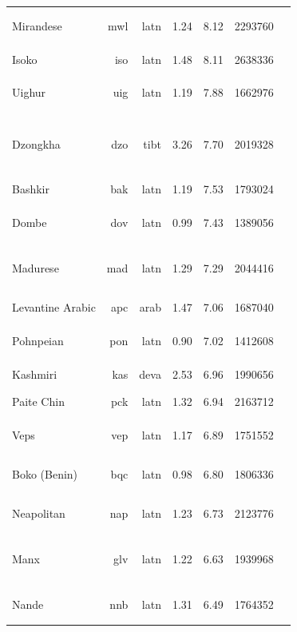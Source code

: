 \documentclass[11pt]{article}
\begin{document}
\begin{center}
\begin{longtable}[width=0.9\textwidth]{|lrrrrrl|}
Mirandese & mwl & latn & 1.24 & 8.12 & 2293760 & {\color{glot500}\rule{2.55cm}{8pt}}{\color{other}\rule{1.4500000000000002cm}{8pt}} \\ 
Isoko & iso & latn & 1.48 & 8.11 & 2638336 & {\color{madlad400}\rule{4.0cm}{8pt}} \\ 
Uighur & uig & latn & 1.19 & 7.88 & 1662976 & {\color{glot500}\rule{0.09cm}{8pt}}{\color{other}\rule{3.91cm}{8pt}} \\ 
Dzongkha & dzo & tibt & 3.26 & 7.70 & 2019328 & {\color{nllb}\rule{0.09cm}{8pt}}{\color{madlad400}\rule{2.99cm}{8pt}}{\color{glot500}\rule{0.54cm}{8pt}}{\color{other}\rule{0.3799999999999999cm}{8pt}} \\ 
Bashkir & bak & latn & 1.19 & 7.53 & 1793024 & {\color{glot500}\rule{4.0cm}{8pt}} \\ 
Dombe & dov & latn & 0.99 & 7.43 & 1389056 & {\color{madlad400}\rule{3.57cm}{8pt}}{\color{other}\rule{0.43000000000000016cm}{8pt}} \\ 
Madurese & mad & latn & 1.29 & 7.29 & 2044416 & {\color{madlad400}\rule{1.03cm}{8pt}}{\color{glot500}\rule{0.34cm}{8pt}}{\color{other}\rule{2.63cm}{8pt}} \\ 
Levantine Arabic & apc & arab & 1.47 & 7.06 & 1687040 & {\color{glot500}\rule{4.0cm}{8pt}}{\color{other}\rule{0.0cm}{8pt}} \\ 
Pohnpeian & pon & latn & 0.90 & 7.02 & 1412608 & {\color{glot500}\rule{0.78cm}{8pt}}{\color{other}\rule{3.2199999999999998cm}{8pt}} \\ 
Kashmiri & kas & deva & 2.53 & 6.96 & 1990656 & {\color{nllb}\rule{4.0cm}{8pt}} \\ 
Paite Chin & pck & latn & 1.32 & 6.94 & 2163712 & {\color{madlad400}\rule{4.0cm}{8pt}} \\ 
Veps & vep & latn & 1.17 & 6.89 & 1751552 & {\color{glot500}\rule{1.82cm}{8pt}}{\color{other}\rule{2.1799999999999997cm}{8pt}} \\ 
Boko (Benin) & bqc & latn & 0.98 & 6.80 & 1806336 & {\color{glot500}\rule{1.93cm}{8pt}}{\color{other}\rule{2.0700000000000003cm}{8pt}} \\ 
Neapolitan & nap & latn & 1.23 & 6.73 & 2123776 & {\color{glot500}\rule{2.49cm}{8pt}}{\color{other}\rule{1.5099999999999998cm}{8pt}} \\ 
Manx & glv & latn & 1.22 & 6.63 & 1939968 & {\color{madlad400}\rule{1.69cm}{8pt}}{\color{glot500}\rule{1.64cm}{8pt}}{\color{other}\rule{0.6699999999999999cm}{8pt}} \\ 
Nande & nnb & latn & 1.31 & 6.49 & 1764352 & {\color{madlad400}\rule{3.76cm}{8pt}}{\color{glot500}\rule{0.2400000000000002cm}{8pt}} \\ 

\end{longtable}
\end{center}
\end{document}
